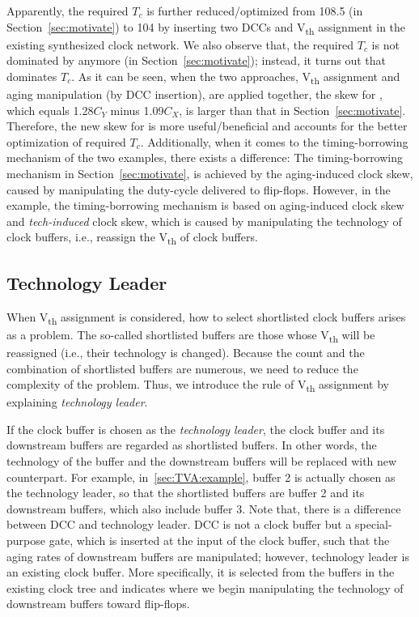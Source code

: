 Apparently, the required $T_c$ is further reduced/optimized from 108.5 (in Section~\ref{sec:motivate}) to 104 by inserting two DCCs and V\textsubscript{th} assignment in the existing synthesized clock network. We also observe that, the required $T_c$ is not dominated by  anymore (in Section~\ref{sec:motivate}); instead, it turns out that  dominates $T_c$. As it can be seen, when the two approaches, V\textsubscript{th} assignment and aging manipulation  (by DCC insertion), are applied together, the skew for , which equals 1.28$C_Y$ minus 1.09$C_X$, is larger than that in Section~\ref{sec:motivate}. Therefore, the new skew for  is more useful/beneficial and accounts for the better optimization of required $T_c$. 
Additionally, when it comes to the timing-borrowing mechanism of the two examples, there exists a difference: The timing-borrowing mechanism in Section~\ref{sec:motivate}, is achieved by the aging-induced clock skew, caused by manipulating the duty-cycle delivered to flip-flops. However, in the example, the timing-borrowing mechanism is based on aging-induced clock skew and \textit{tech-induced} clock skew, which is caused by manipulating the technology of clock buffers, i.e., reassign the V\textsubscript{th} of clock buffers. 

\subsection{Technology Leader}
\label{sec:TVA:leader}
When V\textsubscript{th} assignment is considered, how to select shortlisted clock buffers arises as a problem. The so-called shortlisted buffers are those whose V\textsubscript{th} will be reassigned (i.e., their technology is changed). Because the count and the combination of shortlisted buffers are numerous, we need to reduce the complexity of the problem. Thus, we introduce the rule of V\textsubscript{th} assignment by explaining \textit{technology leader}. 

If the clock buffer is chosen as the \textit{technology leader}, the clock buffer and its downstream buffers are regarded as shortlisted buffers. In other words, the technology of the buffer and the downstream buffers will be replaced with new counterpart. For example, in~\ref{sec:TVA:example}, buffer 2 is actually chosen as the technology leader, so that the shortlisted buffers are buffer 2 and its downstream buffers, which also include buffer 3. Note that, there is a difference between DCC and technology leader. DCC is not a clock buffer but a special-purpose gate, which is inserted at the input of the clock buffer, such that the aging rates of downstream buffers are manipulated; however, technology leader is an existing clock buffer. More specifically, it is selected from the buffers in the existing clock tree and indicates where we begin manipulating the technology of downstream buffers toward flip-flops.

